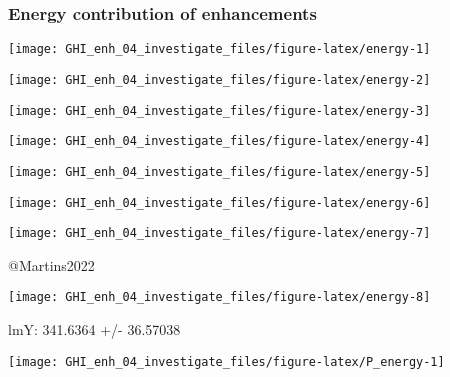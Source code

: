 \documentclass[
  10pt,
  a4paper,oneside]{article}
\begin{document}
\newpage
\FloatBarrier

\hypertarget{energy-contribution-of-enhancements}{%
\subsubsection{Energy contribution of enhancements}\label{energy-contribution-of-enhancements}}

\begin{center}\texttt{[image: GHI\_enh\_04\_investigate\_files/figure-latex/energy-1]} \end{center}

\begin{center}\texttt{[image: GHI\_enh\_04\_investigate\_files/figure-latex/energy-2]} \end{center}

\begin{center}\texttt{[image: GHI\_enh\_04\_investigate\_files/figure-latex/energy-3]} \end{center}

\begin{center}\texttt{[image: GHI\_enh\_04\_investigate\_files/figure-latex/energy-4]} \end{center}

\begin{center}\texttt{[image: GHI\_enh\_04\_investigate\_files/figure-latex/energy-5]} \end{center}

\begin{center}\texttt{[image: GHI\_enh\_04\_investigate\_files/figure-latex/energy-6]} \end{center}

\begin{center}\texttt{[image: GHI\_enh\_04\_investigate\_files/figure-latex/energy-7]} \end{center}

@Martins2022

\begin{center}\texttt{[image: GHI\_enh\_04\_investigate\_files/figure-latex/energy-8]} \end{center}

lmY: 341.6364 +/- 36.57038

\begin{center}\texttt{[image: GHI\_enh\_04\_investigate\_files/figure-latex/P\_energy-1]} \end{center}
\end{document}
